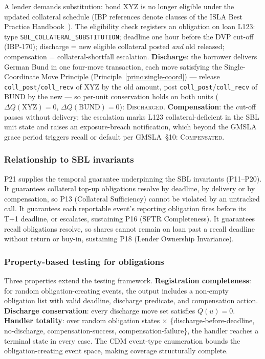 A lender demands substitution: bond XYZ is no longer eligible under the updated collateral schedule (IBP references denote clauses of the ISLA Best Practice Handbook~\cite{isla-ibp}). The eligibility check registers an obligation on loan L123: type \texttt{SBL\_COLLATERAL\_SUBSTITUTION}; deadline one hour before the DVP cut-off (IBP-170); discharge = new eligible collateral posted \emph{and} old released; compensation = collateral-shortfall escalation. \textbf{Discharge}: the borrower delivers German Bund in one four-move transaction, each move satisfying the Single-Coordinate Move Principle (Principle~\ref{princ:single-coord}) --- release \texttt{coll\_post}/\texttt{coll\_recv} of XYZ by the old amount, post \texttt{coll\_post}/\texttt{coll\_recv} of BUND by the new --- so per-unit conservation holds on both units ($\Delta Q(\mathrm{XYZ}) = 0$, $\Delta Q(\mathrm{BUND}) = 0$): \textsc{Discharged}. \textbf{Compensation}: the cut-off passes without delivery; the escalation marks L123 collateral-deficient in the SBL unit state and raises an exposure-breach notification, which beyond the GMSLA grace period triggers recall or default per GMSLA~\S10: \textsc{Compensated}.

\subsubsection{Relationship to SBL invariants}
\label{sec:obligation-sbl-relationship}

P21 supplies the temporal guarantee underpinning the SBL invariants (P11--P20). It guarantees collateral top-up obligations resolve by deadline, by delivery or by compensation, so P13 (Collateral Sufficiency) cannot be violated by an untracked call. It guarantees each reportable event's reporting obligation fires before its T+1 deadline, or escalates, sustaining P16 (SFTR Completeness). It guarantees recall obligations resolve, so shares cannot remain on loan past a recall deadline without return or buy-in, sustaining P18 (Lender Ownership Invariance).

\subsubsection{Property-based testing for obligations}
\label{sec:obligation-testing}

Three properties extend the testing framework. \textbf{Registration completeness}: for random obligation-creating events, the output includes a non-empty obligation list with valid deadline, discharge predicate, and compensation action. \textbf{Discharge conservation}: every discharge move set satisfies $Q(u) = 0$. \textbf{Handler totality}: over random obligation states $\times$ \{discharge-before-deadline, no-discharge, compensation-success, compensation-failure\}, the handler reaches a terminal state in every case. The CDM event-type enumeration bounds the obligation-creating event space, making coverage structurally complete.

